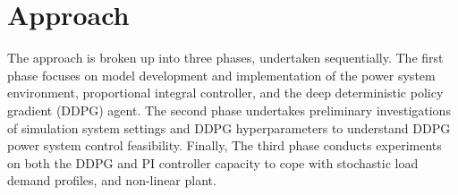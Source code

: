 \chapter{Approach}
The approach is broken up into three phases, undertaken sequentially. The first phase focuses on model development and implementation of the power system environment, proportional integral controller, and the deep deterministic policy gradient (DDPG) agent. The second phase undertakes preliminary investigations of simulation system settings and DDPG hyperparameters to understand DDPG power system control feasibility. Finally, The third phase conducts experiments on both the DDPG and PI controller capacity to cope with stochastic load demand profiles, and non-linear plant.









